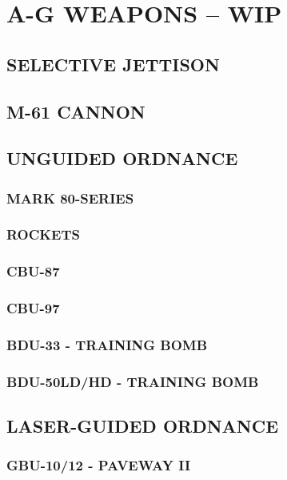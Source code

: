 \chapter{A-G WEAPONS -- WIP}
\localtableofcontents
\cleardoublepage

\section{SELECTIVE JETTISON}

\clearpage

\section{M-61 CANNON}

\clearpage 

\section{UNGUIDED ORDNANCE}

\subsection{MARK 80-SERIES}
\subsection{ROCKETS}
\subsection{CBU-87}
\subsection{CBU-97}
\subsection{BDU-33 - TRAINING BOMB}
\subsection{BDU-50LD/HD - TRAINING BOMB}

\clearpage 

\section{LASER-GUIDED ORDNANCE}

\subsection{GBU-10/12 - PAVEWAY II}
